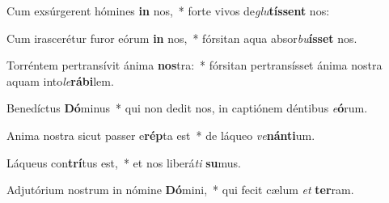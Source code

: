 \item Cum exsúrgerent hómines \textbf{in} nos,~* forte vivos de\textit{glu}\textbf{tís}\textbf{sent} nos:
\item Cum irascerétur furor eórum \textbf{in} nos,~* fórsitan aqua absor\textit{bu}\textbf{ís}\textbf{set} nos.
\item Torréntem pertransívit ánima \textbf{nos}tra:~* fórsitan pertransísset ánima nostra aquam into\textit{le}\textbf{rá}\textbf{bi}lem.
\item Benedíctus \textbf{Dó}minus~* qui non dedit nos, in captiónem déntibus \textit{e}\textbf{ó}rum.
\item Anima nostra sicut passer e\textbf{rép}ta est~* de láqueo \textit{ve}\textbf{nán}\textbf{ti}um.
\item Láqueus con\textbf{trí}tus est,~* et nos liberá\textit{ti} \textbf{su}mus.
\item Adjutórium nostrum in nómine \textbf{Dó}mini,~* qui fecit cælum \textit{et} \textbf{ter}ram.

